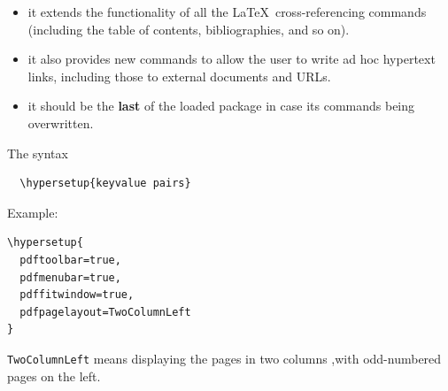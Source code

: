 \documentclass[landscape, headrule, footrule]{foils}
\begin{document}
\begin{itemize}
  \item it extends the functionality of all the \LaTeX\, cross-referencing commands (including
the table of contents, bibliographies, and so on).
  \item it also provides new commands to allow the user to write ad hoc hypertext links,
including those to external documents and URLs.
  \item it should be the \textbf{last} of the loaded package in case its commands being
overwritten.

\end{itemize}



The syntax
\begin{verbatim}
  \hypersetup{keyvalue pairs}
\end{verbatim}

Example:
\begin{verbatim}
\hypersetup{
  pdftoolbar=true,
  pdfmenubar=true,
  pdffitwindow=true,
  pdfpagelayout=TwoColumnLeft 
}
\end{verbatim}

\texttt{TwoColumnLeft} means displaying the pages in two columns ,with odd-numbered pages on the
left.
\end{document}
